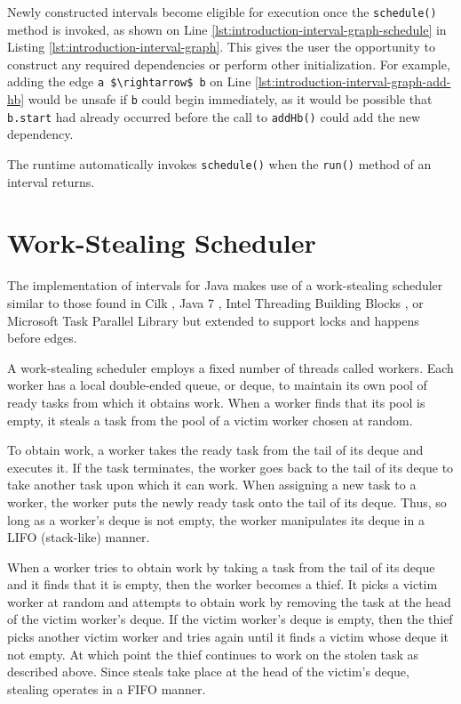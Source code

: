 Newly constructed intervals become eligible for execution once the
\lstinline!schedule()! method is invoked, as shown on Line
\ref{lst:introduction-interval-graph-schedule} in Listing
\ref{lst:introduction-interval-graph}. This gives the user the
opportunity to construct any required dependencies or perform other
initialization. For example, adding the edge
\lstinline!a $\rightarrow$ b! on Line
\ref{lst:introduction-interval-graph-add-hb} would be unsafe if
\lstinline!b! could begin immediately, as it would be possible that
\lstinline!b.start! had already occurred before the call to
\lstinline!addHb()! could add the new dependency.

The runtime automatically invokes \lstinline!schedule()! when the
\lstinline!run()! method of an interval returns.


\section{Work-Stealing Scheduler}
\label{sec:intro-work-stealing-scheduler}

The implementation of intervals for Java makes use of a work-stealing
scheduler similar to those found in Cilk \cite{Blumofe1995,
  Frigo1998}, Java 7 \cite{Lea2000, Lea2000a, Lea2004, Lea2006}, Intel
Threading Building Blocks \cite{Reinders2007, Contreras2008}, or
Microsoft Task Parallel Library \cite{Leijen2009} but extended to
support locks and happens before edges.

A work-stealing scheduler employs a fixed number of threads called
workers. Each worker has a local double-ended queue, or deque, to
maintain its own pool of ready tasks from which it obtains work. When
a worker finds that its pool is empty, it steals a task from the pool
of a victim worker chosen at random.

To obtain work, a worker takes the ready task from the tail of its
deque and executes it. If the task terminates, the worker goes back to
the tail of its deque to take another task upon which it can
work. When assigning a new task to a worker, the worker puts the newly
ready task onto the tail of its deque. Thus, so long as a worker's
deque is not empty, the worker manipulates its deque in a LIFO
(stack-like) manner.

When a worker tries to obtain work by taking a task from the tail of
its deque and it finds that it is empty, then the worker becomes a
thief. It picks a victim worker at random and attempts to obtain work
by removing the task at the head of the victim worker's deque. If the
victim worker's deque is empty, then the thief picks another victim
worker and tries again until it finds a victim whose deque it not
empty. At which point the thief continues to work on the stolen task
as described above. Since steals take place at the head of the
victim's deque, stealing operates in a FIFO manner.

